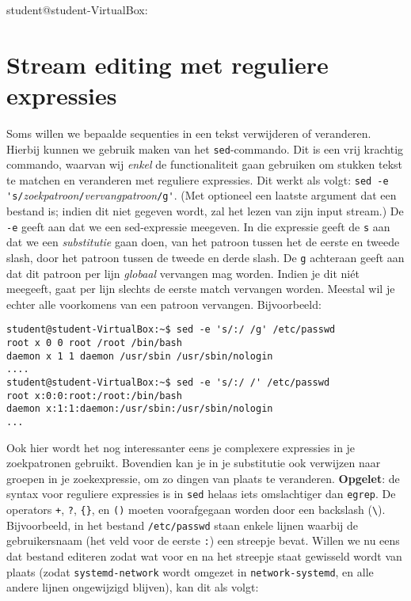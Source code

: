 \documentclass[a4paper,twoside,openany]{memoir}
\begin{document}
student@student-VirtualBox:~\section{Stream editing met reguliere expressies}

Soms willen we bepaalde sequenties in een tekst verwijderen of veranderen. Hierbij kunnen we gebruik maken van het \verb!sed!-commando. Dit is een vrij krachtig commando, waarvan wij \emph{enkel} de functionaliteit gaan gebruiken om stukken tekst te matchen en veranderen met reguliere expressies. Dit werkt als volgt: \verb!sed -e 's/!\emph{zoekpatroon}\verb!/!\emph{vervangpatroon}\verb!/g'!. (Met optioneel een laatste argument dat een bestand is; indien dit niet gegeven wordt, zal het lezen van zijn input stream.) De \verb!-e! geeft aan dat we een sed-expressie meegeven. In die expressie geeft de \verb!s! aan dat we een \emph{substitutie} gaan doen, van het patroon tussen het de eerste en tweede slash, door het patroon tussen de tweede en derde slash. De \verb!g! achteraan geeft aan dat dit patroon per lijn \emph{globaal} vervangen mag worden. Indien je dit ni\'et meegeeft, gaat per lijn slechts de eerste match vervangen worden. Meestal wil je echter alle voorkomens van een patroon vervangen. Bijvoorbeeld:

\begin{verbatim}
student@student-VirtualBox:~$ sed -e 's/:/ /g' /etc/passwd
root x 0 0 root /root /bin/bash
daemon x 1 1 daemon /usr/sbin /usr/sbin/nologin
....
student@student-VirtualBox:~$ sed -e 's/:/ /' /etc/passwd
root x:0:0:root:/root:/bin/bash
daemon x:1:1:daemon:/usr/sbin:/usr/sbin/nologin
...
\end{verbatim}

Ook hier wordt het nog interessanter eens je complexere expressies in je zoekpatronen gebruikt. Bovendien kan je in je substitutie ook verwijzen naar groepen in je zoekexpressie, om zo dingen van plaats te veranderen. \textbf{Opgelet}: de syntax voor reguliere expressies is in \verb!sed! helaas iets omslachtiger dan \verb!egrep!. De operators \verb!+!, \verb!?!, \verb!{}!, en \verb!()! moeten voorafgegaan worden door een backslash (\verb!\!). Bijvoorbeeld, in het bestand \verb!/etc/passwd! staan enkele lijnen waarbij de gebruikersnaam (het veld voor de eerste \verb!:!) een streepje bevat. Willen we nu eens dat bestand editeren zodat wat voor en na het streepje staat gewisseld wordt van plaats (zodat \verb!systemd-network! wordt omgezet in \verb!network-systemd!, en alle andere lijnen ongewijzigd blijven), kan dit als volgt:
\end{document}
